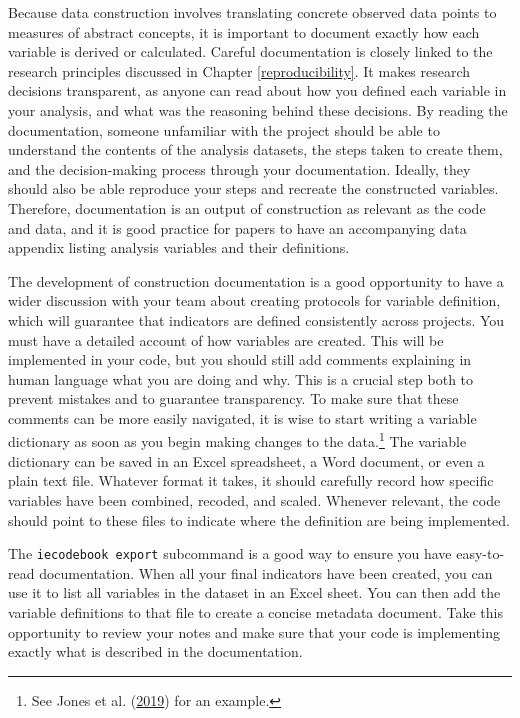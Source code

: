 \documentclass[
]{book}
\begin{document}
Because data construction involves translating concrete observed data points
to measures of abstract concepts,
it is important to document exactly how each variable is derived or calculated.
Careful documentation is closely linked to the research principles discussed in Chapter \ref{reproducibility}.
It makes research decisions transparent,
as anyone can read about how you defined each variable in your analysis,
and what was the reasoning behind these decisions.
By reading the documentation,
someone unfamiliar with the project should be able to understand the contents of the analysis datasets,
the steps taken to create them, and the decision-making process through your documentation.
Ideally, they should also be able reproduce your steps and recreate the constructed variables.
Therefore, documentation is an output of construction as relevant as the code and data,
and it is good practice for papers to have an accompanying data appendix
listing analysis variables and their definitions.

The development of construction documentation is a good opportunity to have
a wider discussion with your team about creating protocols for variable definition,
which will guarantee that indicators are defined consistently across projects.
You must have a detailed account of how variables are created.
This will be implemented in your code, but you should still
add comments explaining in human language what you are doing and why.
This is a crucial step both to prevent mistakes and to guarantee transparency.
To make sure that these comments can be more easily navigated,
it is wise to start writing a variable dictionary as soon as you begin making changes to the data.\footnote{See Jones et al. (\protect\hyperlink{ref-jones2019factor}{2019}) for an example.}
The variable dictionary can be saved in an Excel spreadsheet,
a Word document, or even a plain text file.
Whatever format it takes,
it should carefully record how specific variables have been combined, recoded, and scaled.
Whenever relevant, the code should point to these files to indicate
where the definition are being implemented.

The \texttt{iecodebook\ export} subcommand is
a good way to ensure you have easy-to-read documentation.
When all your final indicators have been created,
you can use it to list all variables in the dataset in an Excel sheet.
You can then add the variable definitions to that file to create a concise metadata document.
Take this opportunity to review your notes and make sure that your code
is implementing exactly what is described in the documentation.
\end{document}
